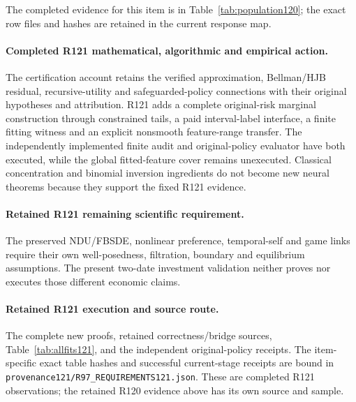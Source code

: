 The completed evidence for this item is in Table~\ref{tab:population120}; the exact row files and hashes are retained in the current response map.

\paragraph{Completed R121 mathematical, algorithmic and empirical action.}
The certification account retains the verified approximation, Bellman/HJB residual, recursive-utility and safeguarded-policy connections with their original hypotheses and attribution. R121 adds a complete original-risk marginal construction through constrained tails, a paid interval-label interface, a finite fitting witness and an explicit nonsmooth feature-range transfer. The independently implemented finite audit and original-policy evaluator have both executed, while the global fitted-feature cover remains unexecuted. Classical concentration and binomial inversion ingredients do not become new neural theorems because they support the fixed R121 evidence.

\paragraph{Retained R121 remaining scientific requirement.}
The preserved NDU/FBSDE, nonlinear preference, temporal-self and game links require their own well-posedness, filtration, boundary and equilibrium assumptions. The present two-date investment validation neither proves nor executes those different economic claims.

\paragraph{Retained R121 execution and source route.}
The complete new proofs, retained correctness/bridge sources, Table~\ref{tab:allfits121}, and the independent original-policy receipts.
The item-specific exact table hashes and successful current-stage receipts are bound in \nolinkurl{provenance121/R97_REQUIREMENTS121.json}. These are completed R121 observations; the retained R120 evidence above has its own source and sample.
